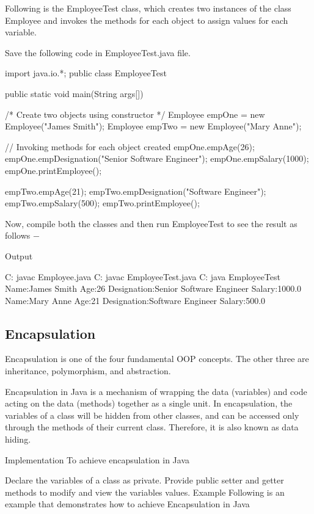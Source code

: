 Following is the EmployeeTest class, which creates two instances of the class Employee and invokes the methods for each object to assign values for each variable.

Save the following code in EmployeeTest.java file.

import java.io.*;
public class EmployeeTest {

   public static void main(String args[]) {
      /* Create two objects using constructor */
      Employee empOne = new Employee("James Smith");
      Employee empTwo = new Employee("Mary Anne");

      // Invoking methods for each object created
      empOne.empAge(26);
      empOne.empDesignation("Senior Software Engineer");
      empOne.empSalary(1000);
      empOne.printEmployee();

      empTwo.empAge(21);
      empTwo.empDesignation("Software Engineer");
      empTwo.empSalary(500);
      empTwo.printEmployee();
   }
}
Now, compile both the classes and then run EmployeeTest to see the result as follows −

Output

C:\> javac Employee.java
C:\> javac EmployeeTest.java
C:\> java EmployeeTest
Name:James Smith
Age:26
Designation:Senior Software Engineer
Salary:1000.0
Name:Mary Anne
Age:21
Designation:Software Engineer
Salary:500.0

\subsection{Encapsulation}

Encapsulation is one of the four fundamental OOP concepts. The other three are inheritance, polymorphism, and abstraction.

Encapsulation in Java is a mechanism of wrapping the data (variables) and code acting on the data (methods) together as a single unit. In encapsulation, the variables of a class will be hidden from other classes, and can be accessed only through the methods of their current class. Therefore, it is also known as data hiding.

Implementation
To achieve encapsulation in Java

Declare the variables of a class as private.
Provide public setter and getter methods to modify and view the variables values.
Example
Following is an example that demonstrates how to achieve Encapsulation in Java

